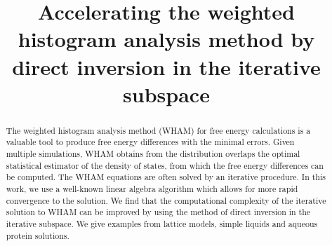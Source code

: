 \documentclass{gMOS2e}
\begin{document}
\newcommand{\vct}[1]{\mathbf{#1}}
\newcommand{\vx}{\vct{x}}
\newcommand{\vy}{\vct{y}}
\newcommand{\Z}{\mathcal{Z}}
\newcommand{\E}{\mathcal{E}}
\newcommand{\Ham}{\mathcal{H}}
\newcommand{\W}{\mathcal{W}}
\newcommand{\A}{\mathcal{A}}

\newcommand{\repl}[2]{{\color{gray} [#1] }{\color{blue} #2}}
\newcommand{\add}[1]{{\color{blue} #1}}
\newcommand{\del}[1]{{\color{gray} [#1]}}
\newcommand{\note}[1]{{\color{OliveGreen}\small [\textbf{Comment.} #1]}}



\title{Accelerating the weighted histogram analysis method
by direct inversion in the iterative subspace}


\author{
}

\maketitle




\begin{abstract}
The weighted histogram analysis method (WHAM)
for free energy calculations
is a valuable tool to produce
free energy differences with the minimal errors.
%
Given multiple simulations,
WHAM obtains
from the distribution overlaps
the optimal statistical estimator
of the density of states,
from which the free energy differences
can be computed.
%
%
The WHAM equations are often solved
by an iterative procedure.
%
In this work,
we use a well-known linear algebra algorithm
which allows for
more
rapid convergence to the solution.
%
%
We find that the computational complexity of
the iterative solution to WHAM
can be improved by using the method of
direct inversion in the iterative subspace.
%
%
We give examples from
lattice models,
simple liquids
and aqueous protein solutions.
\end{abstract}
\end{document}
